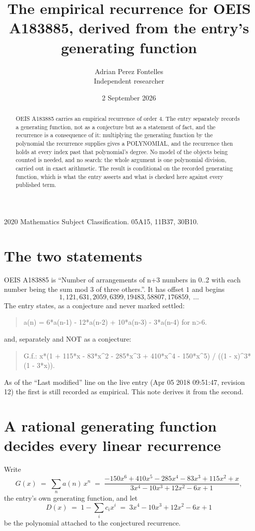 \documentclass[11pt,a4paper]{article}
\title{The empirical recurrence for OEIS A183885, derived from the entry's generating function}
\author{Adrian Perez Fontelles\\ \small Independent researcher}
\date{2 September 2026}
\theoremstyle{plain}
\theoremstyle{definition}
\begin{document}
\maketitle

\begin{abstract}
OEIS A183885 carries an empirical recurrence of order $4$. The entry separately records a
generating function, not as a conjecture but as a statement of fact, and the recurrence is a
consequence of it: multiplying the generating function by the polynomial the recurrence
supplies gives a POLYNOMIAL, and the recurrence then holds at every index past that
polynomial's degree. No model of the objects being counted is needed, and no search: the
whole argument is one polynomial division, carried out in exact arithmetic. The result is
conditional on the recorded generating function, which is what the entry asserts and what is
checked here against every published term.
\end{abstract}

\noindent\small 2020 Mathematics Subject Classification. 05A15, 11B37, 30B10.\normalsize

\section{The two statements}

OEIS A183885 is ``Number of arrangements of n+3 numbers in 0..2 with each number being the sum mod 3 of three others.''. It has offset $1$ and begins
\[
1, 121, 631, 2059, 6399, 19483, 58807, 176859,\ \dots
\]
The entry states, as a conjecture and never marked settled:
\begin{quote}
a(n) = 6*a(n-1) - 12*a(n-2) + 10*a(n-3) - 3*a(n-4) for n>6.
\end{quote}
and, separately and NOT as a conjecture:
\begin{quote}
G.f.: x*(1 + 115*x - 83*x\^{}2 - 285*x\^{}3 + 410*x\^{}4 - 150*x\^{}5) / ((1 - x)\^{}3*(1 - 3*x)).
\end{quote}
As of the ``Last modified'' line on the live entry (Apr 05 2018 09:51:47, revision 12) the first is still
recorded as empirical. This note derives it from the second.

\section{A rational generating function decides every linear recurrence}

Write
\[
G(x)\;=\;\sum_{n}a(n)\,x^{n}\;=\;\frac{- 150 x^{6} + 410 x^{5} - 285 x^{4} - 83 x^{3} + 115 x^{2} + x}{3 x^{4} - 10 x^{3} + 12 x^{2} - 6 x + 1},
\]
the entry's own generating function, and let
\[
D(x)\;=\;1-\sum_i c_i x^{i}\;=\;3 x^{4} - 10 x^{3} + 12 x^{2} - 6 x + 1
\]
be the polynomial attached to the conjectured recurrence.
\end{document}
